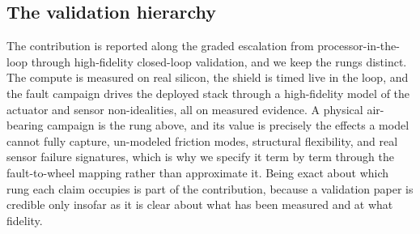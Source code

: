 \documentclass[11pt]{article}
\begin{document}
\subsection{The validation hierarchy} The contribution is reported along the graded
escalation from processor-in-the-loop through high-fidelity closed-loop validation, and we keep the
rungs distinct. The compute is measured on real silicon, the shield is timed live in the loop, and
the fault campaign drives the deployed stack through a high-fidelity model of the actuator and
sensor non-idealities, all on measured evidence. A physical air-bearing campaign is the rung above,
and its value is precisely the effects a model cannot fully capture, un-modeled friction modes,
structural flexibility, and real sensor failure signatures, which is why we specify it term by term
through the fault-to-wheel mapping rather than approximate it. Being exact about which rung each
claim occupies is part of the contribution, because a validation paper is credible only insofar as
it is clear about what has been measured and at what fidelity.
\end{document}

